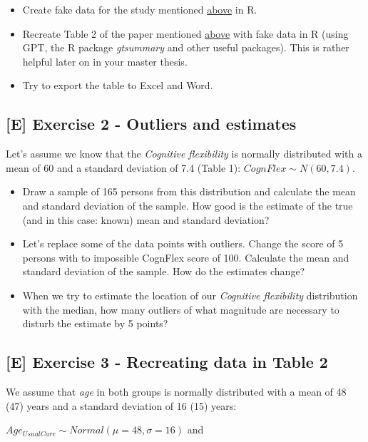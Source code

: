 \documentclass[
]{book}
\providecommand{\tightlist}{%
  \setlength{\itemsep}{0pt}\setlength{\parskip}{0pt}}
\begin{document}
\begin{itemize}
\tightlist
\item
  Create fake data for the study mentioned \hyperref[example_study1_physio]{above} in R.
\item
  Recreate Table 2 of the paper mentioned \hyperref[example_study1_physio]{above} with fake data in R (using GPT, the R package \emph{gtsummary} and other useful packages).
  This is rather helpful later on in your master thesis.
\item
  Try to export the table to Excel and Word.
\end{itemize}

\subsection{{[}E{]} Exercise 2 - Outliers and estimates}\label{e-exercise-2---outliers-and-estimates}

Let's assume we know that the \emph{Cognitive flexibility} is normally distributed with a mean of 60 and a standard deviation of 7.4 (Table 1): \(CognFlex \sim N(60,7.4)\).

\begin{itemize}
\tightlist
\item
  Draw a sample of 165 persons from this distribution and calculate the mean and standard deviation of the sample.
  How good is the estimate of the true (and in this case: known) mean and standard deviation?
\item
  Let's replace some of the data points with outliers. Change the score of 5 persons with to impossible CognFlex score of 100.
  Calculate the mean and standard deviation of the sample. How do the estimates change?
\item
  When we try to estimate the location of our \emph{Cognitive flexibility} distribution with the median,
  how many outliers of what magnitude are necessary to disturb the estimate by 5 points?
\end{itemize}

\subsection{{[}E{]} Exercise 3 - Recreating data in Table 2}\label{exercise3_descriptive_stats}

We assume that \emph{age} in both groups is normally distributed with a mean of 48 (47) years
and a standard deviation of 16 (15) years:

\(Age_{UsualCare} \sim Normal(\mu = 48, \sigma = 16)\) and
\end{document}
